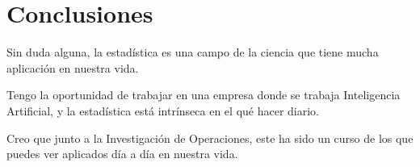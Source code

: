 \chapter{Conclusiones}

Sin duda alguna, la estadística es una campo de la ciencia que tiene mucha aplicación en nuestra vida.

Tengo la oportunidad de trabajar en una empresa donde se trabaja Inteligencia Artificial, y la estadística está intrínseca en el qué hacer diario.

Creo que junto a la Investigación de Operaciones, este ha sido un curso de los que puedes ver aplicados día a día en nuestra vida.

